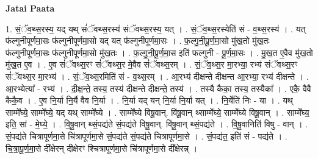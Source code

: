 \documentclass[17pt]{extarticle}
\begin{document}
\textbf{Jatai Paata} \newline

1. सं॒ॅव॒थ्स॒रस्य॒ यद् यथ् सं॑ॅवथ्स॒रस्य॑ संॅवथ्स॒रस्य॒ यत् । . सं॒ॅव॒थ्स॒रस्येति॑ सं - व॒थ्स॒रस्य॑ । . यत् फ॑ल्गुनीपूर्णमा॒सः फ॑ल्गुनीपूर्णमा॒सो यद् यत् फ॑ल्गुनीपूर्णमा॒सः । . फ॒ल्गु॒नी॒पू॒र्ण॒मा॒सो मु॑ख॒तो मु॑ख॒तः फ॑ल्गुनीपूर्णमा॒सः फ॑ल्गुनीपूर्णमा॒सो मु॑ख॒तः । . फ॒ल्गु॒नी॒पू॒र्ण॒मा॒स इति॑ फल्गुनी - पू॒र्ण॒मा॒सः । . मु॒ख॒त ए॒वैव मु॑ख॒तो मु॑ख॒त ए॒व । . ए॒व सं॑ॅवथ्स॒रꣳ सं॑ॅवथ्स॒र मे॒वैव सं॑ॅवथ्स॒रम् । . सं॒ॅव॒थ्स॒र मा॒रभ्या॒ रभ्य॑ संॅवथ्स॒रꣳ सं॑ॅवथ्स॒र मा॒रभ्य॑ । . सं॒ॅव॒थ्स॒रमिति॑ सं - व॒थ्स॒रम् । . आ॒रभ्य॑ दीक्षन्ते दीक्षन्त आ॒रभ्या॒ रभ्य॑ दीक्षन्ते । . आ॒रभ्येत्या᳚ - रभ्य॑ । . दी॒क्ष॒न्ते॒ तस्य॒ तस्य॑ दीक्षन्ते दीक्षन्ते॒ तस्य॑ । . तस्यै कैका॒ तस्य॒ तस्यैका᳚ । . एकै॒ वैवै कैकै॒व । . ए॒व नि॒र्या नि॒र्यै वैव नि॒र्या । . नि॒र्या यद् यन् नि॒र्या नि॒र्या यत् । . नि॒र्येति॑ निः - या । . यथ् साम्मे᳚घ्ये॒ साम्मे᳚घ्ये॒ यद् यथ् साम्मे᳚घ्ये । . साम्मे᳚घ्ये विषू॒वान्. वि॑षू॒वान् थ्साम्मे᳚घ्ये॒ साम्मे᳚घ्ये विषू॒वान् । . साम्मे᳚घ्य॒ इति॒ सां - मे॒घ्ये॒ । . वि॒षू॒वान् थ्सं॒पद्य॑ते सं॒पद्य॑ते विषू॒वान्. वि॑षू॒वान् थ्सं॒पद्य॑ते । . वि॒षू॒वानिति॑ विषु - वान् । . सं॒पद्य॑ते चित्रापूर्णमा॒से चि॑त्रापूर्णमा॒से सं॒पद्य॑ते सं॒पद्य॑ते चित्रापूर्णमा॒से । . सं॒पद्य॑त॒ इति॑ सं - पद्य॑ते । . चि॒त्रा॒पू॒र्ण॒मा॒से दी᳚क्षेरन् दीक्षेरꣳ श्चित्रापूर्णमा॒से चि॑त्रापूर्णमा॒से दी᳚क्षेरन्न् । \newline
\end{document}
